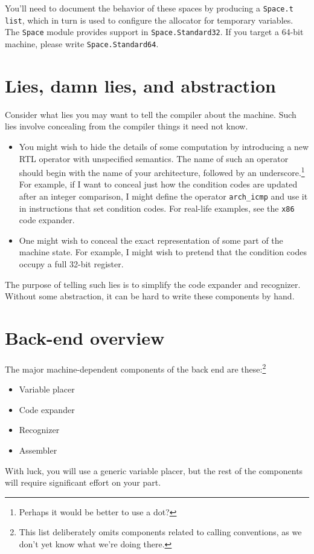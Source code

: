 \documentclass[12pt]{article}
\begin{document}
You'll need to document the behavior of these spaces by producing a
\texttt{Space.t list}, which in turn is used to configure the
allocator for temporary variables.
The \texttt{Space} module provides support in \texttt{Space.Standard32}.
If you target a 64-bit machine, please write \texttt{Space.Standard64}.


\section{Lies, damn lies, and abstraction}

Consider what lies you may want to tell the compiler about the
machine.
Such lies involve concealing from the compiler things it need not
know.
\begin{itemize}
\item
You might wish to hide the details of some computation by introducing
a new RTL operator with unspecified semantics.
The name of such an operator should begin with the name of your
architecture, followed by an underscore.\footnote
{Perhaps it would be better to use a dot?}
For example, if I want to conceal just how the condition codes are
updated after an integer comparison, I might define the operator
\texttt{arch\_icmp} and use it in instructions that set condition codes.
For real-life examples, see the \texttt{x86} code expander.
\item
One might wish to conceal the exact representation of some part of the
machine state.
For example, I might wish to pretend that the condition codes occupy a
full 32-bit register.
\end{itemize}
The purpose of telling such lies is to simplify the code expander and
recognizer.
Without some abstraction, it can be hard to write these components by
hand.

\section{Back-end overview}

The major machine-dependent components of the back end are
these:\footnote
{This list deliberately omits components related to calling
conventions, as we don't yet know what we're doing there.}
\begin{itemize}
\item
Variable placer
\item
Code expander
\item
Recognizer
\item
Assembler
\end{itemize}
With luck, you will use a generic variable placer, but the rest of the
components will require significant effort on your part.
\end{document}

